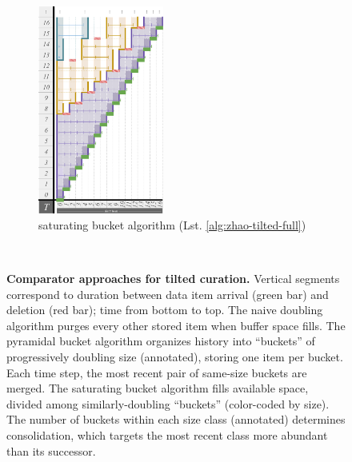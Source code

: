 \begin{figure}
\begin{subfigure}{0.52\linewidth}
\centering
\includegraphics[height=2.7in,width=\linewidth,clip]{img/surface-control-tall-zhao-full-desat50}
\centering
\caption{\footnotesize saturating bucket algorithm (Lst. \ref{alg:zhao-tilted-full})}
\label{fig:surface-control-tilted:saturating-bucket}
\end{subfigure}%
\begin{minipage}{0.06\linewidth}
\centering ~
\end{minipage}%
\begin{minipage}[b]{0.42\linewidth}
\caption{%
\textbf{Comparator approaches for tilted curation.}
\footnotesize
Vertical segments correspond to duration between data item arrival (green bar) and deletion (red bar); time from bottom to top.
The naive doubling algorithm purges every other stored item when buffer space fills.
The pyramidal bucket algorithm organizes history into ``buckets'' of progressively doubling size (annotated), storing one item per bucket.
Each time step, the most recent pair of same-size buckets are merged.
The saturating bucket algorithm fills available space, divided among similarly-doubling ``buckets'' (color-coded by size).
The number of buckets within each size class (annotated) determines consolidation, which targets the most recent class more abundant than its successor.
}
\label{fig:surface-control-tilted}

\vspace{6ex}

\end{minipage}


\end{figure}

